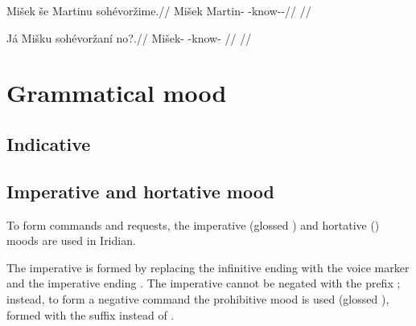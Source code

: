 \pex
\begingl
\gla Mišek še Martinu sohévoržime.//
\glb Mišek \Com{} Martin-\Ins{} \Rec{}-know-\Av{}-\Prog{}//
\glft {}//
\endgl
\xe

\pex
\begingl
\gla Já Mišku sohévoržaní no?.//
\glb {} Mišek-\Ins{} \Rec{}-know- //
\glft {}//
\endgl
\xe



\section{Grammatical mood}

\subsection{Indicative}

\subsection{Imperative and hortative mood}\label{sec:imp-hort}

To form commands and requests, the imperative (glossed ) and hortative () moods are used in Iridian.

The imperative is formed by replacing the infinitive ending  with the voice marker and the imperative ending . The imperative cannot be negated with the prefix ; instead, to form a negative command the prohibitive mood is used (glossed ), formed with the suffix  instead of .

